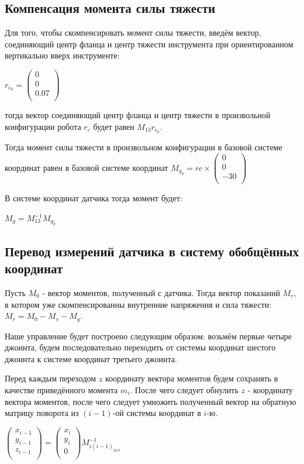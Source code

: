 \documentclass[a4paper,14pt,russian]{extreport} \usepackage{extsizes}
\begin{document}
	\subsection{Компенсация момента силы тяжести}
	Для того, чтобы скомпенсировать момент силы тяжести, введём вектор, соединяющий центр фланца и центр тяжести инструмента при ориентированном вертикально вверх инструменте:
	
	$r_{c_0} =  \begin{pmatrix}
			  0 \\ 0 \\ 0.07\\
			  \end{pmatrix}$

	тогда вектор соединяющий центр фланца и центр тяжести в произвольной конфигурации робота $r_{c}$ будет равен $M_{13}r_{c_0}$.
	
	Тогда момент силы тяжести в произвольном конфигурации в базовой системе координат равен в базовой системе координат $M_{g_0}=r{c}\times\begin{pmatrix}
	0 \\ 0 \\ -30\\
	\end{pmatrix}$
	
	В системе координат датчика тогда момент будет:
	
	$M_{g}=M_{13}^{-1}M_{g_0}$
	
	\subsection{Перевод измерений датчика в систему обобщённых координат}
	Пусть $M_{0}$ - вектор моментов, полученный с датчика. Тогда вектор показаний $M_{r}$, в котором уже скомпенсированны внутренние напряжения и сила тяжести:
	$M_{r}=	M_{0}-M_{v}-M_{g}$.		
	
	Наше управление будет построено следующим образом: возьмём первые четыре джоинта, будем последовательно переходить от системы координат шестого джоинта к системе координат третьего джоинта.
	
	 Перед каждым переходом $z$ координату вектора моментов будем сохранять в качестве приведённого момента $m_{i}$. После чего следует обнулить $z$ - координату вектора моментов, после чего следует умножить полученный вектор на обратную матрицу поворота из $(i-1)$-ой системы координат в $i$-ю.
	
	$\begin{pmatrix}
	x_{i-1} \\ y_{i-1} \\ z_{i-1}\\
	\end{pmatrix} = 
	\begin{pmatrix}
	x_{i} \\ y_{i} \\ 0\\
	\end{pmatrix} M_{i(i-1)_{3x3}}^{-1}$
	
\end{document}

